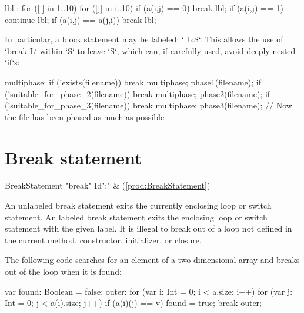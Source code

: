 \begin{xten}
lbl : for ([i] in 1..10) {
   for ([j] in i..10) {  
      if (a(i,j) == 0) break lbl;
      if (a(i,j) == 1) continue lbl;
      if (a(i,j) == a(j,i)) break lbl;
   }
}
\end{xten}

In particular, a block statement may be labeled: \xcd` L:{S}`.  This allows
the use of \xcd`break L` within \xcd`S` to leave \xcd`S`, which can, if
carefully used, avoid deeply-nested \xcd`if`s: 

\begin{xten}
multiphase: {
  if (!exists(filename)) break multiphase;
  phase1(filename);
  if (!suitable_for_phase_2(filename)) break multiphase;
  phase2(filename);
  if (!suitable_for_phase_3(filename)) break multiphase;
  phase3(filename);
}
// Now the file has been phased as much as possible
\end{xten}



\section{Break statement}

\begin{bbgrammar}
 BreakStatement    \: \xcd"break" Id\opt \xcd";" & (\ref{prod:BreakStatement})\\%
\end{bbgrammar}


An unlabeled break statement exits the currently enclosing loop or switch
statement. An labeled break statement exits the enclosing loop or switch
statement with the given label.
It is illegal to break out of a loop not defined in the current
method, constructor, initializer, or closure.  

The following code searches for an element of a two-dimensional
array and breaks out of the loop when it is found:

\begin{xten}
var found: Boolean = false;
outer: for (var i: Int = 0; i < a.size; i++)
    for (var j: Int = 0; j < a(i).size; j++)
        if (a(i)(j) == v) {
            found = true;
            break outer;
        }
\end{xten}

